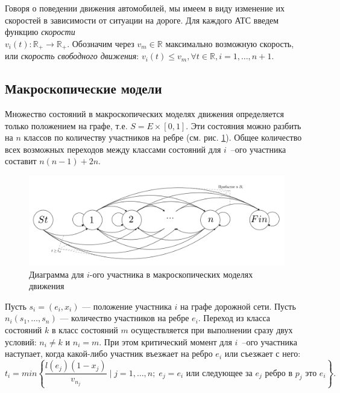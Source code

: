 \documentclass[12pt, a4paper]{article}
\begin{document}
	Говоря о поведении движения автомобилей, мы имеем в виду изменение их скоростей в зависимости от ситуации на дороге. Для каждого АТС введем функцию \textit{скорости} \\ ${v_i(t) : \mathbb {R}_+ \rightarrow \mathbb {R}_+}$.  Обозначим через $v_m \in \mathbb {R}$ максимально возможную скорость, или \textit{скорость свободного движения}: $v_i(t) \leq v_m, \forall t \in \mathbb {R}, i = 1, \dots, n+1$.
	\fi
	
	
	\subsection{Макроскопические модели}
	
	
	Множество состояний в макроскопических моделях движения определяется только положением на графе, т.е. $S = E \times [0, 1]$. Эти состояния
	можно разбить на $n$ классов по количеству участников на ребре (см. рис. \ref{ris:macro_diag}).  Общее количество всех возможных переходов между классами состояний для $i$~--ого участника составит $n(n-1) + 2n$.
	
	\begin{figure}[H]
		\centering
		\includegraphics[scale=0.2]{Macro-gen.png}
		\caption{Диаграмма для $i$-ого участника в макроскопических моделях движения}
		\label{ris:macro_diag}
	\end{figure}
	Пусть $s_i = (e_i, x_i)$ --- положение участника $i$ на графе дорожной сети. Пусть $n_i(s_1, \dots, s_n)$ --- количество участников на ребре $e_i$. Переход из класса состояний $k$ в класс состояний $m$ осуществляется при выполнении сразу двух условий: $n_i \neq k$ и $n_i = m$. При этом критический момент для $i$~--ого участника наступает, когда какой-либо участник въезжает на ребро $e_i$ или съезжает с него:
	$$t_i = min \left\{\frac{l(e_j)\left(1-x_j\right)}{v_{n_j}} \; \bigg| \; j = 1, \dots, n; \; e_j = e_i \text{ или следующее за } e_j \text{ ребро в } p_j \text{ это } e_i\right\}.$$
	
\end{document}
